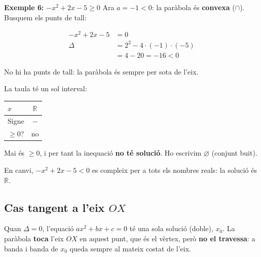 \begin{exemple}{\textbf{Exemple 6:} $-x^2+2x-5\geq 0$}
Ara $a=-1<0$: la paràbola és \textbf{convexa} ($\cap$). Busquem els punts de tall:

\[
\begin{aligned}
-x^2+2x-5&=0\\
\Delta&=2^2-4\cdot(-1)\cdot(-5)\\
&=4-20=-16<0
\end{aligned}
\]

No hi ha punts de tall: la paràbola és sempre per sota de l'eix.

\begin{center}
\end{center}

La taula té un sol interval:

\begin{center}
\begin{tabular}{lc}
\toprule
$x$ & $\mathbb{R}$ \\
\midrule
Signe & $-$ \\
$\geq 0$? & no \\
\bottomrule
\end{tabular}
\end{center}

Mai és $\geq 0$, i per tant la inequació \textbf{no té solució}. Ho escrivim $\varnothing$ (conjunt buit).

En canvi, $-x^2+2x-5<0$ es compleix per a tots els nombres reals: la solució és $\mathbb{R}$.
\end{exemple}

\subsection{\texorpdfstring{Cas tangent a l'eix $OX$}{Cas tangent a l'eix OX}}

Quan $\Delta=0$, l'equació $ax^2+bx+c=0$ té una sola solució (doble), $x_0$. La paràbola \textbf{toca} l'eix $OX$ en aquest punt, que és el vèrtex, però \textbf{no el travessa}: a banda i banda de $x_0$ queda sempre al mateix costat de l'eix.


